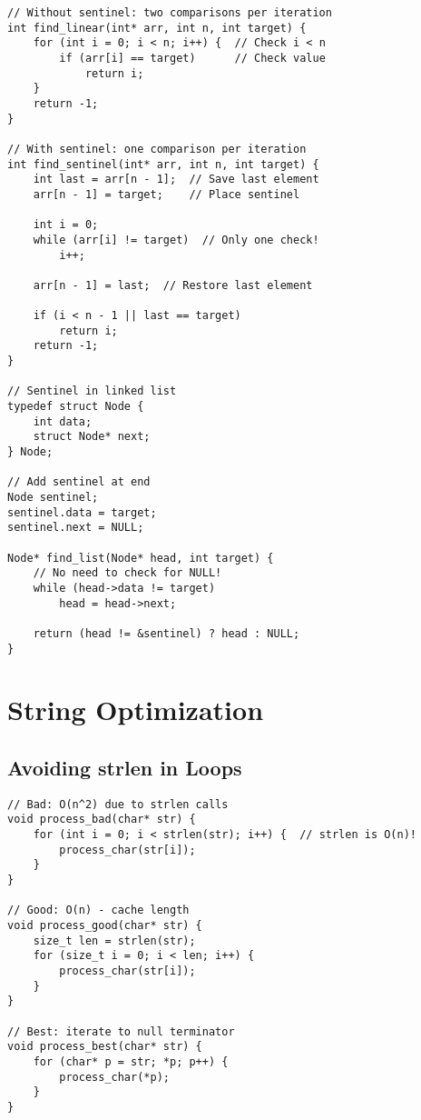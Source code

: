 \begin{lstlisting}
// Without sentinel: two comparisons per iteration
int find_linear(int* arr, int n, int target) {
    for (int i = 0; i < n; i++) {  // Check i < n
        if (arr[i] == target)      // Check value
            return i;
    }
    return -1;
}

// With sentinel: one comparison per iteration
int find_sentinel(int* arr, int n, int target) {
    int last = arr[n - 1];  // Save last element
    arr[n - 1] = target;    // Place sentinel

    int i = 0;
    while (arr[i] != target)  // Only one check!
        i++;

    arr[n - 1] = last;  // Restore last element

    if (i < n - 1 || last == target)
        return i;
    return -1;
}

// Sentinel in linked list
typedef struct Node {
    int data;
    struct Node* next;
} Node;

// Add sentinel at end
Node sentinel;
sentinel.data = target;
sentinel.next = NULL;

Node* find_list(Node* head, int target) {
    // No need to check for NULL!
    while (head->data != target)
        head = head->next;

    return (head != &sentinel) ? head : NULL;
}
\end{lstlisting}

\section{String Optimization}

\subsection{Avoiding strlen in Loops}

\begin{lstlisting}
// Bad: O(n^2) due to strlen calls
void process_bad(char* str) {
    for (int i = 0; i < strlen(str); i++) {  // strlen is O(n)!
        process_char(str[i]);
    }
}

// Good: O(n) - cache length
void process_good(char* str) {
    size_t len = strlen(str);
    for (size_t i = 0; i < len; i++) {
        process_char(str[i]);
    }
}

// Best: iterate to null terminator
void process_best(char* str) {
    for (char* p = str; *p; p++) {
        process_char(*p);
    }
}
\end{lstlisting}

